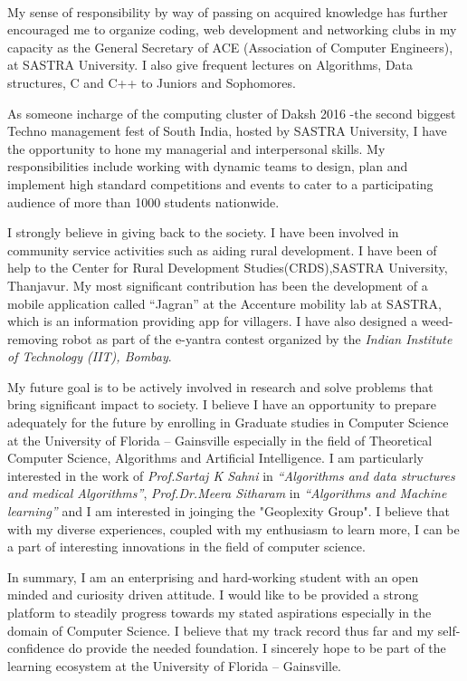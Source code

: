 \documentclass[11pt]{article}
\begin{document}
\\\par
My sense of responsibility by way of passing on acquired knowledge has further encouraged me to organize coding, web development and networking clubs in my capacity as the General Secretary of ACE (Association of Computer Engineers), at SASTRA University. I also give frequent lectures on Algorithms, Data structures, C and C++ to Juniors and Sophomores.
\\\par
As someone incharge of the computing cluster of Daksh 2016 -the second biggest Techno management fest of South India, hosted by SASTRA University, I have the opportunity to hone my managerial and interpersonal skills. My responsibilities include working with dynamic teams to design, plan and implement high standard competitions and events to cater to a participating audience of more than 1000 students nationwide. 
\\\par
I strongly believe in giving back to the society. I have been involved in community service activities such as aiding rural development.  I have been of help to the Center for Rural Development Studies(CRDS),SASTRA University, Thanjavur. My most significant contribution has been the development of a mobile application called ``Jagran'' at the Accenture mobility lab at SASTRA, which is an information providing app for villagers. I have also designed a weed-removing robot as part of the e-yantra contest organized by the \emph{Indian Institute of Technology (IIT), Bombay}.
\\\par
My future goal is to be actively involved in research and solve problems that bring significant impact to society. I believe I have an opportunity to prepare adequately for the future by enrolling in Graduate studies in Computer Science at the University of Florida -- Gainsville especially in the field of Theoretical Computer Science, Algorithms and Artificial Intelligence. I am particularly interested in the work of \emph{Prof.Sartaj K Sahni} in \emph{``Algorithms and data structures and medical Algorithms''}, \emph{Prof.Dr.Meera Sitharam} in \emph{``Algorithms and Machine learning''} and I am interested in joinging the "Geoplexity Group". I believe that with my diverse experiences, coupled with my enthusiasm to learn more, I can be a part of interesting innovations in the field of computer science.
\\\par
In summary, I am an enterprising and hard-working student with an open minded and curiosity driven attitude.  I would like to be provided a strong platform to steadily progress towards my stated aspirations especially in the domain of Computer Science.  I believe that my track record thus far and my self-confidence do provide the needed foundation.  I sincerely hope to be part of the learning ecosystem at the University of Florida -- Gainsville.
\end{document}
